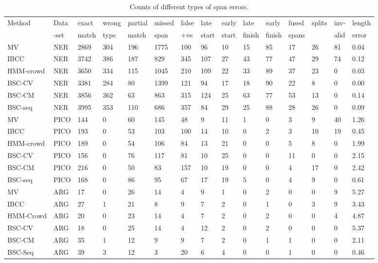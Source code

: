 \begin{table}[h]
\small
\centering
\setlength{\tabcolsep}{4pt}
\begin{tabular}{l l l l l l l l l l l l l l l }
\toprule
Method & Data & exact & wrong & partial  & missed  & false & late & early & late & early & fused & splits & inv- &  length \\ 
 & -set & match & type & match & span & +ve & start & start & finish & finish & spans &  & alid & error \\
\midrule
MV & NER & 2869 & 304 & 196 & 1775 & 100 & 96 & 10 & 15 & 85 & 17 & 26 & 81 & 0.04 \\
IBCC & NER & 3742 & 386 & 187 & 829 & 345 & 107 & 27 & 43 & 77 & 47 & 29 & 74 & 0.12 \\
HMM-crowd & NER & 3650 & 334 & 115 & 1045 & 210 & 109 & 22 & 33 & 89 & 37 & 23 & 0 & 0.03 \\
BSC-CV & NER & 3381 & 284 & 80 & 1399 & 121 & 94 & 17 & 18 & 90 & 22 & 8 & 0 & 0.00 \\
BSC-CM & NER & 3856 & 362 & 63 & 863 & 315 & 124 & 25 & 63 & 77 & 53 & 13 & 0 & 0.14 \\
BSC-seq & NER & 3995 & 353 & 110 & 686 & 357 &  84 &  29 &  25 &  88 &  28 &  26 & 0 & 0.09 \\
\midrule 
MV & PICO  & 144 & 0 & 60 & 145 & 48 & 9 & 11 & 1 & 0 & 3 & 9 & 40 & 1.26 \\
IBCC & PICO & 193 & 0 & 53 & 103 & 100 & 14 & 10 & 0 & 2 & 3 & 10 & 19 & 0.45 \\
HMM-crowd& PICO & 189 & 0 & 54 & 106 & 84 & 13 & 21 & 0 & 0 & 5 & 8 & 0 & 1.99 \\
BSC-CV     & PICO & 156 & 0 & 76 & 117 & 81 & 10 & 25 & 0 & 0 & 11 & 0 & 0 & 2.15 \\
BSC-CM     & PICO & 216 & 0 & 50 & 83 & 157 & 10 & 19 & 0 & 0 & 4 & 17 & 0 & 2.42\\
BSC-seq    & PICO & 168 & 0 & 86 & 95 & 67 & 17 & 19 & 5 & 0 & 4 & 9 & 0 & 0.61 \\
\midrule 
MV & ARG & 17 &  0 & 26 & 14 &  4  &  9 & 1 &  0 & 2 &  0 &  0 & 9 & 5.27 \\
IBCC & ARG & 27 & 1 & 21 & 8 & 9 & 7 & 2 & 0 & 1 & 0 & 3 & 9 & 3.43 \\
HMM-Crowd & ARG & 20 & 0 & 23 & 14 & 4 & 7 & 2 & 0 & 2 & 0 & 0 & 4 & 4.87 \\
BSC-CV & ARG & 18 & 0 & 25 & 14 & 4 & 12 & 2 & 0 & 2 & 0 & 0 & 0 & 5.37 \\
BSC-CM & ARG & 35 & 1 & 12 & 9 & 9 & 7 & 2 & 0 & 1 & 1 & 0 & 0 & 2.11 \\
BSC-Seq & ARG & 39 & 3 & 12 & 3 & 20 & 6 & 4 & 0 & 0 & 1 & 0 & 0 & 0.46 \\
\bottomrule
\end{tabular}
\caption{Counts of different types of span errors.}
\label{tab:error_analysis}
\end{table}

